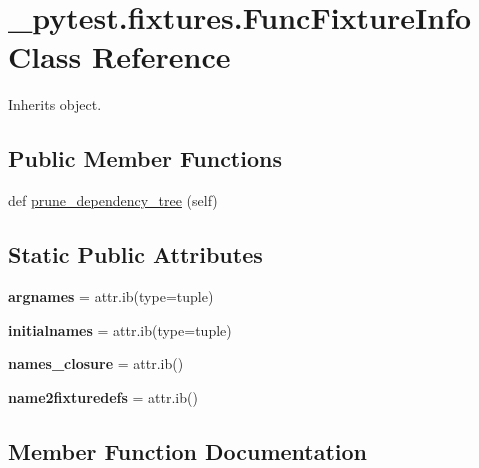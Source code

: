 \hypertarget{class__pytest_1_1fixtures_1_1_func_fixture_info}{}\section{\+\_\+pytest.\+fixtures.\+Func\+Fixture\+Info Class Reference}
\label{class__pytest_1_1fixtures_1_1_func_fixture_info}


Inherits object.

\subsection*{Public Member Functions}
\begin{DoxyCompactItemize}
\item 
def \hyperlink{class__pytest_1_1fixtures_1_1_func_fixture_info_a9d5dcacd522060736b3a6316d97af0f0}{prune\+\_\+dependency\+\_\+tree} (self)
\end{DoxyCompactItemize}
\subsection*{Static Public Attributes}
\begin{DoxyCompactItemize}
\item 
\mbox{\label{class__pytest_1_1fixtures_1_1_func_fixture_info_ae00a314985cc58b886c6e17ba7fb8e23}} 
{\bfseries argnames} = attr.\+ib(type=tuple)
\item 
\mbox{\label{class__pytest_1_1fixtures_1_1_func_fixture_info_a4b7c3e7ea2a1e2bd817328c3251f692d}} 
{\bfseries initialnames} = attr.\+ib(type=tuple)
\item 
\mbox{\label{class__pytest_1_1fixtures_1_1_func_fixture_info_a278fcf9f598bb3d3e7ff706c938ea137}} 
{\bfseries names\+\_\+closure} = attr.\+ib()
\item 
\mbox{\label{class__pytest_1_1fixtures_1_1_func_fixture_info_aba0fc74b2d2a9058113a478e242d7849}} 
{\bfseries name2fixturedefs} = attr.\+ib()
\end{DoxyCompactItemize}


\subsection{Member Function Documentation}
\mbox{\label{class__pytest_1_1fixtures_1_1_func_fixture_info_a9d5dcacd522060736b3a6316d97af0f0}} 

